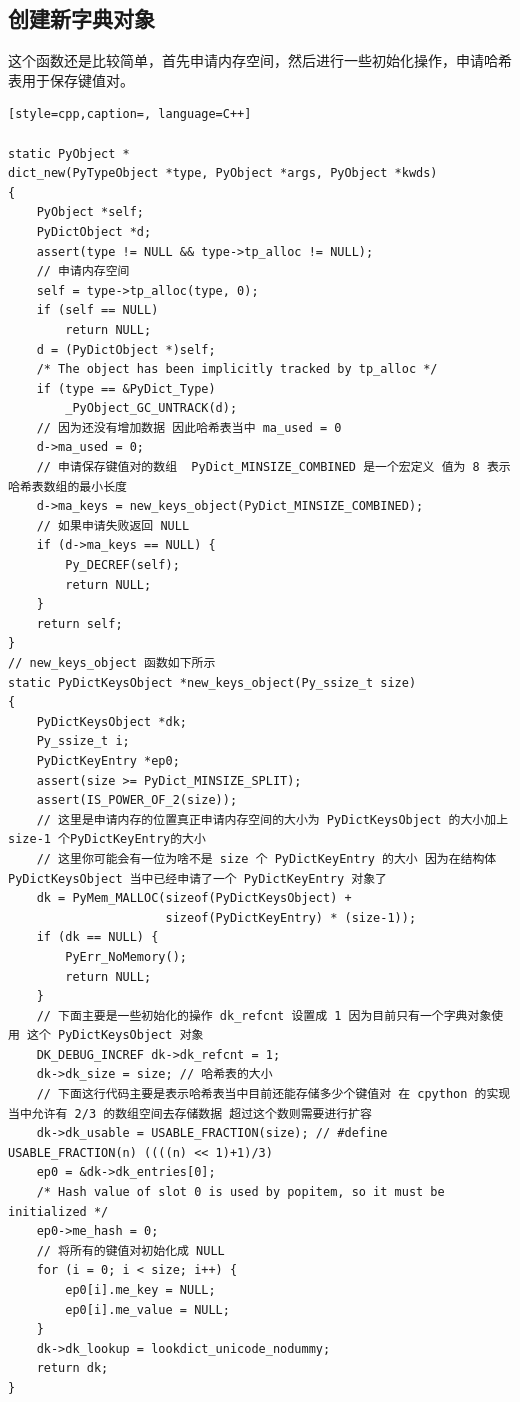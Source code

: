 \subsection{创建新字典对象}
这个函数还是比较简单，首先申请内存空间，然后进行一些初始化操作，申请哈希表用于保存键值对。
\begin{lstlisting}[style=cpp,caption=, language=C++]

static PyObject *
dict_new(PyTypeObject *type, PyObject *args, PyObject *kwds)
{
    PyObject *self;
    PyDictObject *d;
    assert(type != NULL && type->tp_alloc != NULL);
    // 申请内存空间
    self = type->tp_alloc(type, 0);
    if (self == NULL)
        return NULL;
    d = (PyDictObject *)self;
    /* The object has been implicitly tracked by tp_alloc */
    if (type == &PyDict_Type)
        _PyObject_GC_UNTRACK(d);
    // 因为还没有增加数据 因此哈希表当中 ma_used = 0
    d->ma_used = 0;
    // 申请保存键值对的数组  PyDict_MINSIZE_COMBINED 是一个宏定义 值为 8 表示哈希表数组的最小长度
    d->ma_keys = new_keys_object(PyDict_MINSIZE_COMBINED);
    // 如果申请失败返回 NULL
    if (d->ma_keys == NULL) {
        Py_DECREF(self);
        return NULL;
    }
    return self;
}
// new_keys_object 函数如下所示
static PyDictKeysObject *new_keys_object(Py_ssize_t size)
{
    PyDictKeysObject *dk;
    Py_ssize_t i;
    PyDictKeyEntry *ep0;
    assert(size >= PyDict_MINSIZE_SPLIT);
    assert(IS_POWER_OF_2(size));
    // 这里是申请内存的位置真正申请内存空间的大小为 PyDictKeysObject 的大小加上 size-1 个PyDictKeyEntry的大小
    // 这里你可能会有一位为啥不是 size 个 PyDictKeyEntry 的大小 因为在结构体 PyDictKeysObject 当中已经申请了一个 PyDictKeyEntry 对象了
    dk = PyMem_MALLOC(sizeof(PyDictKeysObject) +
                      sizeof(PyDictKeyEntry) * (size-1));
    if (dk == NULL) {
        PyErr_NoMemory();
        return NULL;
    }
    // 下面主要是一些初始化的操作 dk_refcnt 设置成 1 因为目前只有一个字典对象使用 这个 PyDictKeysObject 对象
    DK_DEBUG_INCREF dk->dk_refcnt = 1;
    dk->dk_size = size; // 哈希表的大小
    // 下面这行代码主要是表示哈希表当中目前还能存储多少个键值对 在 cpython 的实现当中允许有 2/3 的数组空间去存储数据 超过这个数则需要进行扩容
    dk->dk_usable = USABLE_FRACTION(size); // #define USABLE_FRACTION(n) ((((n) << 1)+1)/3)
    ep0 = &dk->dk_entries[0];
    /* Hash value of slot 0 is used by popitem, so it must be initialized */
    ep0->me_hash = 0;
    // 将所有的键值对初始化成 NULL
    for (i = 0; i < size; i++) {
        ep0[i].me_key = NULL;
        ep0[i].me_value = NULL;
    }
    dk->dk_lookup = lookdict_unicode_nodummy;
    return dk;
}
\end{lstlisting}
